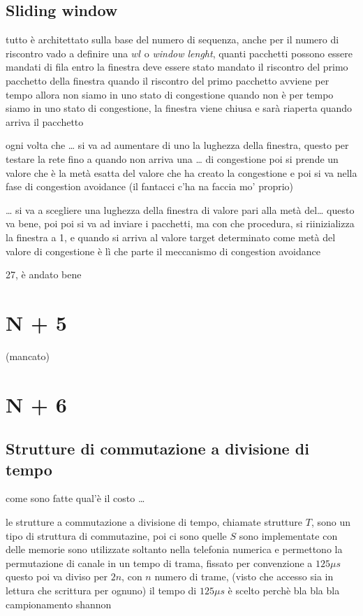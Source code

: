 \documentclass[11pt]{article}
\begin{document}
\subsection{Sliding window}
\label{sec:org65e2d83}
tutto è architettato sulla base del numero di sequenza, anche per il numero di riscontro
vado a definire una \(wl\) o \emph{window lenght}, quanti pacchetti possono essere mandati di fila
entro la finestra deve essere stato mandato il riscontro del primo pacchetto della finestra
quando il riscontro del primo pacchetto avviene per tempo allora non siamo in uno stato di congestione
quando non è per tempo siamo in uno stato di congestione, la finestra viene chiusa e sarà riaperta quando arriva il pacchetto

ogni volta che \ldots{} si va ad aumentare di uno la lughezza della finestra, questo per testare la rete fino a quando non arriva una \ldots{} di congestione
poi si prende un valore che è la metà esatta del valore che ha creato la congestione e poi si va nella fase di congestion avoidance
(il fantacci c'ha na faccia mo' proprio)

\ldots{}
si va a scegliere una lughezza della finestra di valore pari alla metà del\ldots{} questo va bene, poi
poi si va ad inviare i pacchetti, ma con che procedura, si riinizializza la finestra a 1, e quando si arriva al valore target determinato come metà del valore di congestione è lì che parte il meccanismo di congestion avoidance

27, è andato bene

\section{N + 5}
\label{sec:orgf2b0513}
(mancato)

\section{N + 6}
\label{sec:org9cc9893}
\subsection{Strutture di commutazione a divisione di tempo}
\label{sec:orgc8699a6}
come sono fatte
qual'è il costo
\ldots{}

le strutture a commutazione a divisione di tempo, chiamate strutture \(T\), sono un tipo di struttura di commutazine, poi ci sono quelle \(S\)
sono implementate con delle memorie
sono utilizzate soltanto nella telefonia numerica e permettono la permutazione di canale
in un tempo di trama, fissato per convenzione a \(125 \mu s\)
questo poi va diviso per \(2n\), con \(n\) numero di trame, (visto che accesso sia in lettura che scrittura per ognuno)
il tempo di \(125 \mu s\) è scelto perchè bla bla bla campionamento shannon
\end{document}
